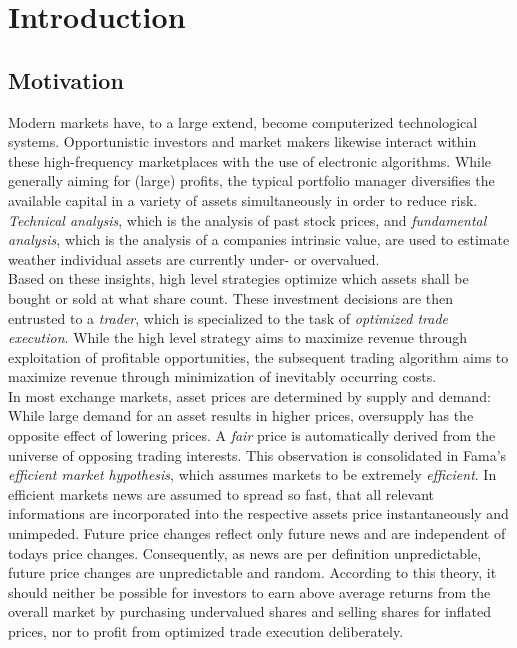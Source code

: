\chapter{Introduction}
\label{chap:introduction}
\section{Motivation} 
\label{sec:motivation}
Modern markets have, to a large extend, become computerized technological systems. Opportunistic investors and market makers likewise interact within these high-frequency marketplaces with the use of electronic algorithms. While generally aiming for (large) profits, the typical portfolio manager diversifies the available capital in a variety of assets simultaneously in order to reduce risk. \emph{Technical analysis}, which is the analysis of past stock prices, and \emph{fundamental analysis}, which is the analysis of a companies intrinsic value, are used to estimate weather individual assets are currently under- or overvalued.\\

Based on these insights, high level strategies optimize which assets shall be bought or sold at what share count. These investment decisions are then entrusted to a \emph{trader}, which is specialized to the task of \emph{optimized trade execution}. While the high level strategy aims to maximize revenue through exploitation of profitable opportunities, the subsequent trading algorithm aims to maximize revenue through minimization of inevitably occurring costs.\\

In most exchange markets, asset prices are determined by supply and demand: While large demand for an asset results in higher prices, oversupply has the opposite effect of lowering prices. A \emph{fair} price is automatically derived from the universe of opposing trading interests. This observation is consolidated in Fama's \emph{efficient market hypothesis}\Cite{Fama70efficientcapital}, which assumes markets to be extremely \emph{efficient}. In efficient markets news are assumed to spread so fast, that all relevant informations are incorporated into the respective assets price instantaneously and unimpeded. Future price changes reflect only future news and are independent of todays price changes. Consequently, as news are per definition unpredictable, future price changes are unpredictable and random. According to this theory, it should neither be possible for investors to earn above average returns from the overall market by purchasing undervalued shares and selling shares for inflated prices, nor to profit from optimized trade execution deliberately.\\

